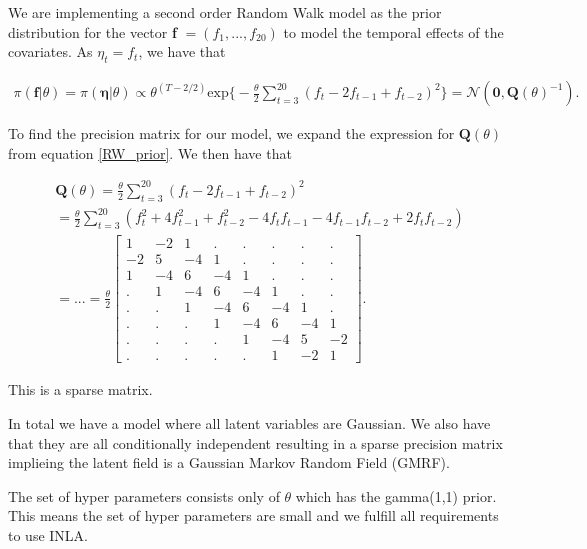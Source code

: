 We are implementing a second order Random Walk model as the prior distribution for the vector \textbf{f} $= (f_1,...,f_{20})$ to model the temporal effects of the covariates. As $\eta_t = f_t$, we have that 

\begin{align} \label{RW_prior}
    \pi(\mathbf{f}|\theta) = \pi(\mathbf{\eta}|\theta) \propto
    \theta^{(T-2/2)} \text{exp} \Bigg\{  -\frac{\theta}{2} \sum_{t = 3}^{20} (f_t - 2f_{t-1} + f_{t-2})^2  \Bigg\} = \mathcal{N}(\mathbf{0}, \mathbf{Q}(\theta)^{-1}).
\end{align}


To find the precision matrix for our model, we expand the expression for $\textbf{Q}(\theta)$ from equation \ref{RW_prior}. We then have that 

\begin{align} \label{precision_mat}
    \textbf{Q}(\theta) =\frac{\theta}{2} \sum_{t = 3}^{20} (f_t - 2f_{t-1} + f_{t-2})^2 \nonumber \\
    = \frac{\theta}{2}\sum_{t = 3}^{20} (f_t^2 + 4f_{t-1}^2 + f_{t-2}^2 - 4f_t f_{t-1} - 4 f_{t-1} f_{t-2} + 2f_t f_{t-2}) \nonumber \\
    = ... = \frac{\theta}{2}
    \begin{bmatrix}
        1 & -2 & 1 & . & . & . & . & . \\
        -2 & 5 & -4 & 1 & . & . & . & .  \\
        1 & -4 & 6 & -4 & 1 & . & . &  . \\
        . & 1 & -4 & 6 & -4 & 1 & . & . \\
        . & . & 1 & -4 & 6 & -4 & 1 & . \\
        . & . & . & 1 & -4 & 6 & -4 & 1 \\
        . & . & . & . & 1& -4& 5 & -2 \\
        . & . & . & . & . & 1 & -2 & 1 
    \end{bmatrix}.
\end{align}

This is a sparse matrix. 

In total we have a model where all latent variables are Gaussian. We also have that they are all conditionally independent resulting in a sparse precision matrix implieing the latent field is a Gaussian Markov Random Field (GMRF). 

The set of hyper parameters consists only of $\theta$ which has the gamma(1,1) prior. This means the set of hyper parameters are small and we fulfill all requirements to use INLA.

